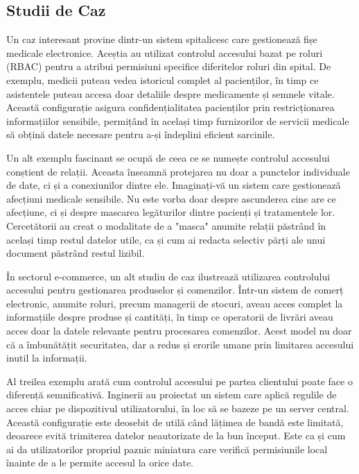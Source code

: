 \documentclass[runningheads]{llncs}
\begin{document}
\begin{spacing}{1.5}
\section{Studii de Caz}
Un caz interesant provine dintr-un sistem spitalicesc care gestionează fișe medicale electronice. Aceștia au utilizat controlul accesului bazat pe roluri (RBAC) pentru a atribui permisiuni specifice diferitelor roluri din spital. De exemplu, medicii puteau vedea istoricul complet al pacienților, în timp ce asistentele puteau accesa doar detaliile despre medicamente și semnele vitale. Această configurație asigura confidențialitatea pacienților prin restricționarea informațiilor sensibile, permițând în același timp furnizorilor de servicii medicale să obțină datele necesare pentru a-și îndeplini eficient sarcinile.

Un alt exemplu fascinant se ocupă de ceea ce se numește controlul accesului conștient de relații. Aceasta înseamnă protejarea nu doar a punctelor individuale de date, ci și a conexiunilor dintre ele. Imaginați-vă un sistem care gestionează afecțiuni medicale sensibile. Nu este vorba doar despre ascunderea cine are ce afecțiune, ci și despre mascarea legăturilor dintre pacienți și tratamentele lor. Cercetătorii au creat o modalitate de a "masca" anumite relații păstrând în același timp restul datelor utile, ca și cum ai redacta selectiv părți ale unui document păstrând restul lizibil.

În sectorul e-commerce, un alt studiu de caz ilustrează utilizarea controlului accesului pentru gestionarea produselor și comenzilor. Într-un sistem de comerț electronic, anumite roluri, precum managerii de stocuri, aveau acces complet la informațiile despre produse și cantități, în timp ce operatorii de livrări aveau acces doar la datele relevante pentru procesarea comenzilor. Acest model nu doar că a îmbunătățit securitatea, dar a redus și erorile umane prin limitarea accesului inutil la informații.

Al treilea exemplu arată cum controlul accesului pe partea clientului poate face o diferență semnificativă. Inginerii au proiectat un sistem care aplică regulile de acces chiar pe dispozitivul utilizatorului, în loc să se bazeze pe un server central. Această configurație este deosebit de utilă când lățimea de bandă este limitată, deoarece evită trimiterea datelor neautorizate de la bun început. Este ca și cum ai da utilizatorilor propriul paznic miniatura care verifică permisiunile local înainte de a le permite accesul la orice date.


\end{spacing}
\end{document}
